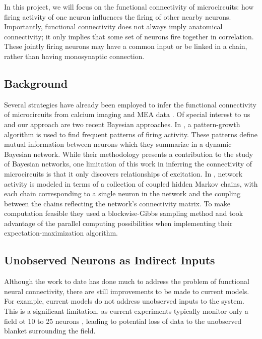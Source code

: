 \documentclass{article}
\begin{document}
In this project, we will focus on the functional connectivity of
microcircuits: how firing activity of one neuron influences the
firing of other nearby neurons.  Importantly, functional connectivity
does not always imply anatomical connectivity; it only implies that
some set of neurons fire together in correlation.  These jointly
firing neurons may have a common input or be linked in a chain,
rather than having monosynaptic connection.

\subsection{Background}

Several strategies have already been employed to infer the functional
connectivity of microcircuits from calcium imaging and MEA data
\citep{Gerwinn2010, takahashi2007, aguiar2009}. Of special interest
to us and our approach are two recent Bayesian approaches. In
\citep{patnaik2011}, a pattern-growth algorithm is used to find
frequent patterns of firing activity. These patterns define mutual
information between neurons which they summarize in a dynamic
Bayesian network. While their methodology presents a contribution
to the study of Bayesian networks, one limitation of this work in
inferring the connectivity of microcircuits is that it only discovers
relationships of excitation. In \citep{mishchencko2011}, network
activity is modeled in terms of a collection of coupled hidden
Markov chains, with each chain corresponding to a single neuron in
the network and the coupling between the chains reflecting the
network’s connectivity matrix.  To make computation feasible they
used a blockwise-Gibbs sampling method and took advantage of the
parallel computing possibilities when implementing their
expectation-maximization algorithm.

\subsection{Unobserved Neurons as Indirect Inputs}

Although the work to date has done much to address the problem of
functional neural connectivity, there are still improvements to be
made to current models. For example, current models do not address
unobserved inputs to the system. This is a significant limitation,
as current experiments typically monitor only a field ot 10 to 25 
neurons \citep{mischenko2011}, leading to potential loss of data
to the unobserved blanket surrounding the field.
\end{document}
